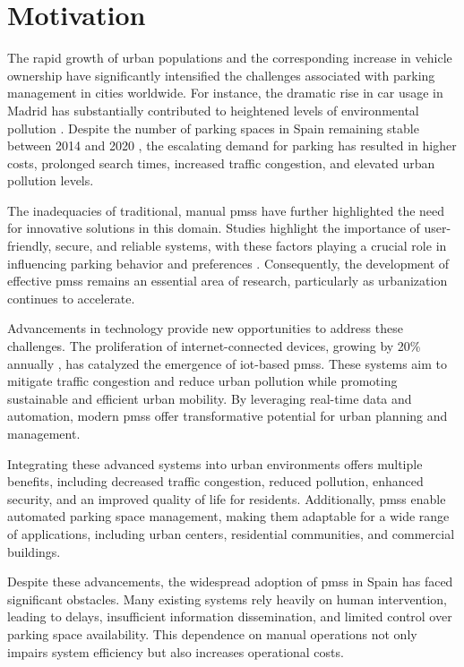 \chapter{Motivation}\label{ch:motivation}

The rapid growth of urban populations and the corresponding increase in vehicle ownership have significantly intensified the challenges associated with parking management in cities worldwide. For instance, the dramatic rise in car usage in Madrid has substantially contributed to heightened levels of environmental pollution \autocite{environmental_impact_madrid_central}. Despite the number of parking spaces in Spain remaining stable between 2014 and 2020 \autocite{urban_mobility_trends}, the escalating demand for parking has resulted in higher costs, prolonged search times, increased traffic congestion, and elevated urban pollution levels.

The inadequacies of traditional, manual \glspl{pms} have further highlighted the need for innovative solutions in this domain. Studies highlight the importance of user-friendly, secure, and reliable systems, with these factors playing a crucial role in influencing parking behavior and preferences \autocite{parking_choices}. Consequently, the development of effective \glspl{pms} remains an essential area of research, particularly as urbanization continues to accelerate.

Advancements in technology provide new opportunities to address these challenges. The proliferation of internet-connected devices, growing by 20\% annually \autocite{iot_growth}, has catalyzed the emergence of \gls{iot}-based \glspl{pms}. These systems aim to mitigate traffic congestion and reduce urban pollution while promoting sustainable and efficient urban mobility. By leveraging real-time data and automation, modern \glspl{pms} offer transformative potential for urban planning and management.

Integrating these advanced systems into urban environments offers multiple benefits, including decreased traffic congestion, reduced pollution, enhanced security, and an improved quality of life for residents. Additionally, \glspl{pms} enable automated parking space management, making them adaptable for a wide range of applications, including urban centers, residential communities, and commercial buildings.

Despite these advancements, the widespread adoption of \glspl{pms} in Spain has faced significant obstacles. Many existing systems rely heavily on human intervention, leading to delays, insufficient information dissemination, and limited control over parking space availability. This dependence on manual operations not only impairs system efficiency but also increases operational costs.

